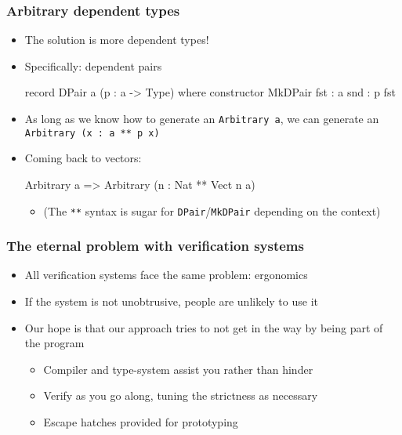 \documentclass[compress,handout]{beamer}
\begin{document}
\begin{frame}[fragile]
  \frametitle{Arbitrary dependent types}

  \begin{itemize}
    \item The solution is more dependent types!
    \item Specifically: dependent pairs

    \vspace*{-6mm}
    \begin{idrislisting}
record DPair a (p : a -> Type) where
  constructor MkDPair
  fst : a
  snd : p fst
    \end{idrislisting}
    \vspace*{-3mm}

    \item As long as we know how to generate an {\textasciigrave
          \texttt{Arbitrary a}\textasciigrave}, we can generate an
          {\textasciigrave\texttt{Arbitrary (x : a ** p x)}\textasciigrave}
    \item Coming back to vectors:
    \vspace*{-6mm}
    \begin{idrislisting}
Arbitrary a => Arbitrary (n : Nat ** Vect n a)
    \end{idrislisting}
    \begin{itemize}
    \vspace*{-2mm}

      \item (The \texttt{**} syntax is sugar for \texttt{DPair}/\texttt{MkDPair}
            depending on the context)
    \end{itemize}
  \end{itemize}

\end{frame}


\begin{frame}
  \frametitle{The eternal problem with verification systems}

  \begin{itemize}
    \item<1-> All verification systems face the same problem: ergonomics
    \item<2-> If the system is not unobtrusive, people are unlikely to use it
    \item<3-> Our hope is that our approach tries to not get in the way by being
              part of the program
      \begin{itemize}
        \item<4-> Compiler and type-system assist you rather than hinder
        \item<5-> Verify as you go along, tuning the strictness as necessary
        \item<6-> Escape hatches provided for prototyping
      \end{itemize}
  \end{itemize}

\end{frame}
\end{document}
